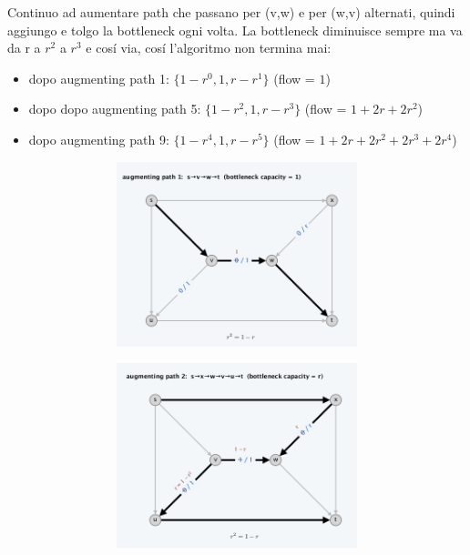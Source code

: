 Continuo ad aumentare path che passano per (v,w) e per (w,v) alternati,
quindi aggiungo e tolgo la bottleneck ogni volta. La bottleneck
diminuisce sempre ma va da r a $r^2$ a $r^3$ e cosí via, cosí
l'algoritmo non termina mai:
\begin{itemize}
    \item dopo augmenting path 1: $\{ 1 - r^0, 1, r - r^1 \}$ (flow = $1$)
    \item dopo dopo augmenting path 5: $\{ 1 - r^2, 1, r - r^3 \}$ (flow = $1 + 2r + 2r^2$)
    \item dopo augmenting path 9: $\{ 1 - r^4, 1, r - r^5 \}$ (flow = $1 + 2r + 2r^2 + 2r^3 + 2r^4$)\\
\end{itemize}
\begin{figure}[H]
	\begin{subfigure}{\textwidth}
		\centering
		\begin{subfigure}{.33\textwidth}
			\centering
			\includegraphics[width=\linewidth]{Network_flow/imgs/ex1.png}
		\end{subfigure}%
		\begin{subfigure}{.33\textwidth}
			\centering
			\includegraphics[width=\linewidth]{Network_flow/imgs/ex2.png}

\end{subfigure}
\end{subfigure}
\end{figure}
